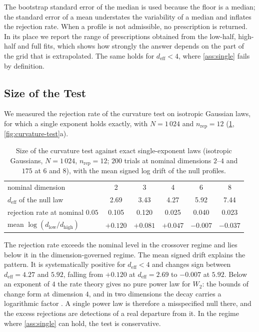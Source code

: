 \documentclass[twoside,11pt]{article}
\theoremstyle{plain}
\theoremstyle{definition}
\theoremstyle{remark}
\newcommand{\Wtwo}{\ensuremath{W_2}}
\newcommand{\deff}{\ensuremath{d_{\mathrm{eff}}}}
\begin{document}
The bootstrap standard error of the median is used because the floor is a
median; the standard error of a mean understates the variability of a
median and inflates the rejection rate. When a profile is not admissible,
no prescription is returned. In its place we report the range of
prescriptions obtained from the low-half, high-half and full fits, which
shows how strongly the answer depends on the part of the grid that is
extrapolated. The same holds for $\deff < 4$, where \cref{ass:single}
fails by definition.

\subsection{Size of the Test}\label{sec:sizing-size}

We measured the rejection rate of the curvature test on isotropic Gaussian
laws, for which a single exponent holds exactly, with $N = 1\,024$ and
$n_{\mathrm{rep}} = 12$ (\cref{tab:curvature-size}, \cref{fig:curvature-test}a).

\begin{table}[htbp]
\centering
\small
\begin{tabular}{lccccc}
\toprule
nominal dimension & 2 & 3 & 4 & 6 & 8 \\
$\deff$ of the null law & 2.69 & 3.43 & 4.27 & 5.92 & 7.44 \\
\midrule
rejection rate at nominal $0.05$ & 0.105 & 0.120 & 0.025 & 0.040 & 0.023 \\
mean $\log(d_{\mathrm{low}}/d_{\mathrm{high}})$
  & $+0.120$ & $+0.081$ & $+0.047$ & $-0.007$ & $-0.037$ \\
\bottomrule
\end{tabular}
\caption{Size of the curvature test against exact single-exponent laws
(isotropic Gaussians, $N = 1\,024$, $n_{\mathrm{rep}} = 12$; $200$ trials
at nominal dimensions $2$--$4$ and $175$ at $6$ and $8$), with the mean
signed log drift of the null profiles.}\label{tab:curvature-size}
\end{table}

The rejection rate exceeds the nominal level in the crossover regime and
lies below it in the dimension-governed regime. The mean signed drift
explains the pattern. It is systematically positive for $\deff < 4$ and
changes sign between $\deff = 4.27$ and $5.92$, falling from $+0.120$ at
$\deff = 2.69$ to $-0.007$ at $5.92$. Below an exponent of $4$ the rate
theory gives no pure power law for $\Wtwo$: the bounds of
\citet{fournier2015} change form at dimension $4$, and in two dimensions
the decay carries a logarithmic factor \citep{ajtai1984}. A single power
law is therefore a misspecified null there, and the excess rejections are
detections of a real departure from it. In the regime where
\cref{ass:single} can hold, the test is conservative.
\end{document}
